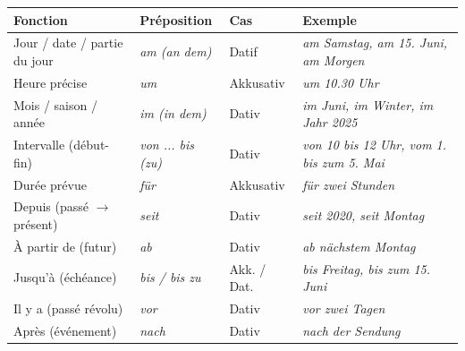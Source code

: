 \documentclass[11pt]{article}
\newcommand{\all}[1]{\ifmmode\text{\textit{#1}}\else\begingroup\selectlanguage{ngerman}\itshape #1\endgroup\fi}
\begin{document}
\begin{methode}
\begin{center}
\begin{tabularx}{\linewidth}{|X|X|X|X|}
\hline
\rowcolor{popblueL} \textbf{Fonction} & \textbf{Préposition} & \textbf{Cas} & \textbf{Exemple} \\ \hline
Jour / date / partie du jour & \all{am} (an dem) & Datif & \all{am Samstag, am 15. Juni, am Morgen} \\ \hline
Heure précise & \all{um} & Akkusativ & \all{um 10.30 Uhr} \\ \hline
Mois / saison / année & \all{im} (in dem) & Dativ & \all{im Juni, im Winter, im Jahr 2025} \\ \hline
Intervalle (début-fin) & \all{von ... bis (zu)} & Dativ & \all{von 10 bis 12 Uhr, vom 1. bis zum 5. Mai} \\ \hline
Durée prévue & \all{für} & Akkusativ & \all{für zwei Stunden} \\ \hline
Depuis (passé $\rightarrow$ présent) & \all{seit} & Dativ & \all{seit 2020, seit Montag} \\ \hline
À partir de (futur) & \all{ab} & Dativ & \all{ab nächstem Montag} \\ \hline
Jusqu'à (échéance) & \all{bis} / \all{bis zu} & Akk. / Dat. & \all{bis Freitag, bis zum 15. Juni} \\ \hline
Il y a (passé révolu) & \all{vor} & Dativ & \all{vor zwei Tagen} \\ \hline
Après (événement) & \all{nach} & Dativ & \all{nach der Sendung} \\ \hline
\end{tabularx}
\end{center}
\end{methode}
\end{document}
